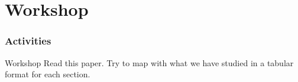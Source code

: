 \documentclass{beamer}
\begin{document}
\section{Workshop}

\begin{frame}
\frametitle{Activities}
\footnotesize
\begin{block}{Workshop}
Read this paper.  Try to map with what we have studied in a tabular format for each section.
\end{block}
\end{frame}




%
%
%



%
%


%
%
%
\end{document}
